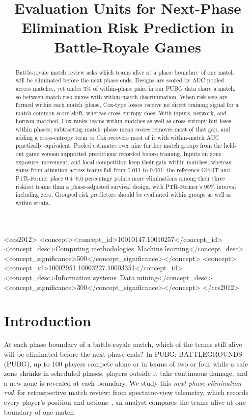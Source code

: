 \documentclass[sigconf,anonymous,nonacm]{acmart}
\begin{document}
\title[Evaluation Units for Next-Phase Elimination Prediction]{Evaluation Units for Next-Phase Elimination Risk Prediction in Battle-Royale Games}
\begin{abstract}
Battle-royale match review asks which teams alive at a phase boundary of one match will be eliminated before the next phase ends. Designs are scored by AUC pooled across matches, yet under 3\% of within-phase pairs in our PUBG data share a match, so between-match risk mixes with within-match discrimination. When risk sets are formed within each match--phase, Cox-type losses receive no direct training signal for a match-common score shift, whereas cross-entropy does. With inputs, network, and horizon matched, Cox ranks teams within matches as well as cross-entropy but loses within phases; subtracting match--phase mean scores removes most of that gap, and adding a cross-entropy term to Cox recovers most of it with within-match AUC practically equivalent. Pooled estimates over nine further match groups from the held-out game version supported predictions recorded before training. Inputs on zone exposure, movement, and local competition keep their gain within matches, whereas gains from attention across teams fall from 0.011 to 0.001; the reference GBDT and PTR-Former place 0.4--0.6 percentage points more eliminations among their three riskiest teams than a phase-adjusted survival design, with PTR-Former's 95\% interval including zero. Grouped risk predictors should be evaluated within groups as well as within strata.
\end{abstract}
\begin{CCSXML}
<ccs2012>
<concept><concept_id>10010147.10010257</concept_id><concept_desc>Computing methodologies~Machine learning</concept_desc><concept_significance>500</concept_significance></concept>
<concept><concept_id>10002951.10003227.10003351</concept_id><concept_desc>Information systems~Data mining</concept_desc><concept_significance>300</concept_significance></concept>
</ccs2012>
\end{CCSXML}
\maketitle
\section{Introduction}
\label{sec:introduction}
At each phase boundary of a battle-royale match, which of the teams still alive will be eliminated before the next phase ends? In PUBG: BATTLEGROUNDS (PUBG), up to 100 players compete alone or in teams of two or four while a safe zone shrinks in scheduled phases; players outside it take continuous damage, and a new zone is revealed at each boundary. We study this \emph{next-phase elimination risk} for retrospective match review: from spectator-view telemetry, which records every player's position and actions~\cite{PUBGAPI}, an analyst compares the teams alive at one boundary of one match.
\end{document}
